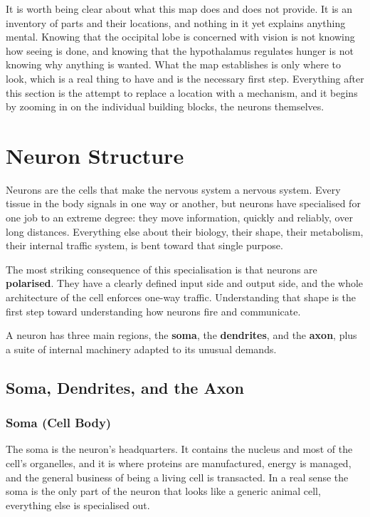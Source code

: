 \documentclass[11pt]{article}
\begin{document}
It is worth being clear about what this map does and does not provide. It is an inventory of parts and their locations, and nothing in it yet explains anything mental. Knowing that the occipital lobe is concerned with vision is not knowing how seeing is done, and knowing that the hypothalamus regulates hunger is not knowing why anything is wanted. What the map establishes is only where to look, which is a real thing to have and is the necessary first step. Everything after this section is the attempt to replace a location with a mechanism, and it begins by zooming in on the individual building blocks, the neurons themselves.

\section{Neuron Structure}

Neurons are the cells that make the nervous system a nervous system. Every tissue in the body signals in one way or another, but neurons have specialised for one job to an extreme degree: they move information, quickly and reliably, over long distances. Everything else about their biology, their shape, their metabolism, their internal traffic system, is bent toward that single purpose.

The most striking consequence of this specialisation is that neurons are \textbf{polarised}. They have a clearly defined input side and output side, and the whole architecture of the cell enforces one-way traffic. Understanding that shape is the first step toward understanding how neurons fire and communicate.

A neuron has three main regions, the \textbf{soma}, the \textbf{dendrites}, and the \textbf{axon}, plus a suite of internal machinery adapted to its unusual demands.

\subsection{Soma, Dendrites, and the Axon}

\subsubsection{Soma (Cell Body)}

The soma is the neuron's headquarters. It contains the nucleus and most of the cell's organelles, and it is where proteins are manufactured, energy is managed, and the general business of being a living cell is transacted. In a real sense the soma is the only part of the neuron that looks like a generic animal cell, everything else is specialised out.
\end{document}
